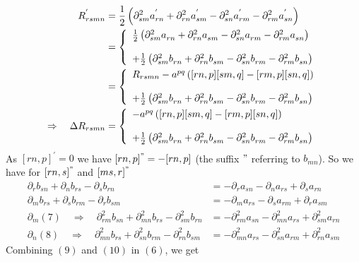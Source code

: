 \begin{align}
R_{rsmn}^{'} &= \frac{1}{2}\left(\partial^2_{sm} a^{'}_{rn}+\partial^2_{rn} a^{'}_{sm}-\partial^2_{sn} a^{'}_{rm}-\partial^2_{rm} a^{'}_{sn}\right) \\
 &= \left\{\begin{array}{l}\frac{1}{2}\left(\partial^2_{sm} a^{}_{rn}+\partial^2_{rn} a^{}_{sm}-\partial^2_{sn} a^{}_{rm}-\partial^2_{rm} a^{}_{sn}\right)\\\\+\frac{1}{2}\left(\partial^2_{sm} b^{}_{rn}+\partial^2_{rn} b^{}_{sm}-\partial^2_{sn} b^{}_{rm}-\partial^2_{rm} b^{}_{sn}\right) \end{array}\right.\\
  &= \left\{\begin{array}{l}R_{rsmn}-a^{pq}\left([rn,p][sm,q] - [rm,p][sn,q]\right)\\\\+\frac{1}{2}\left(\partial^2_{sm} b^{}_{rn}+\partial^2_{rn} b^{}_{sm}-\partial^2_{sn} b^{}_{rm}-\partial^2_{rm} b^{}_{sn}\right) \end{array}\right.\\
  \Rightarrow \quad \Delta R_{rsmn}&= \left\{\begin{array}{l}-a^{pq}\left([rn,p][sm,q] - [rm,p][sn,q]\right)\\\\
  +\frac{1}{2}\left(\partial^2_{sm} b^{}_{rn}+\partial^2_{rn} b^{}_{sm}-\partial^2_{sn} b^{}_{rm}-\partial^2_{rm} b^{}_{sn}\right) \end{array}\right.
\end{align}
As $[rn,p]^{'}=0$ we have $[rn,p]^{"}=-[rn,p]$ (the suffix $"$ referring to $b_{mn}$).
So we have for $[rn,s]^{"}$ and $[ms,r]^{"}$
\begin{align}
\partial_r b_{sn} + \partial_n b_{rs}-\partial_s b_{rn} &= -\partial_r a_{sn} - \partial_n a_{rs}+\partial_s a_{rn} \\
\partial_m b_{rs} + \partial_s b_{rm}-\partial_r b_{sm} &= -\partial_m a_{rs} - \partial_s a_{rm}+\partial_r a_{sm} \\
\partial_m (7) \quad\Rightarrow\quad \partial^2_{rm} b_{sn} + \partial^2_{mn} b_{rs}-\partial^2_{sm} b_{rn} &= -\partial^2_{rm} a_{sn} - \partial^2_{mn} a_{rs}+\partial^2_{sm} a_{rn}\\
\partial_n (8) \quad\Rightarrow\quad \partial^2_{mn} b_{rs} + \partial^2_{sn} b_{rm}-\partial^2_{rn} b_{sm} &= -\partial^2_{mn} a_{rs} - \partial^2_{sn} a_{rm}+\partial^2_{rn} a_{sm}
\end{align}
Combining $(9)$ and $(10)$ in $(6)$, we get
